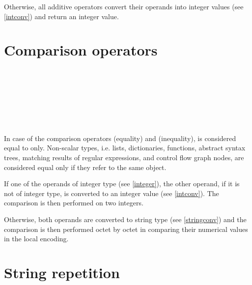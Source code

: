 Otherwise, all additive operators convert their operands into integer
values (see \ref{intconv}) and return an integer value.

\section{Comparison operators}

\begin{grammar}
      \produces {} \\
      \produces {}
         \lextoken{==}  \\
      \produces {}
         \lextoken{!=}  \\
      \produces {}
         \lextoken{<}  \\
      \produces {}
         \lextoken{<=}  \\
      \produces {}
         \lextoken{>=}  \\
      \produces {}
         \lextoken{>} 
\end{grammar}

\noindent
In case of the comparison operators \token{==} (equality)
and \token{!=} (inequality),  is considered equal
to  only. Non-scalar types, i.e. lists, dictionaries,
functions, abstract syntax trees, matching results of regular
expressions, and control flow graph nodes, are considered equal
only if they refer to the same object.

If one of the operands of integer type (see \ref{integer}),
the other operand, if it is not of integer type, is converted to an
integer value (see \ref{intconv}). The comparison is then performed
on two integers.

Otherwise, both operands are converted to string type (see \ref{stringconv})
and the comparison is then performed octet by octet in comparing
their numerical values in the local encoding.

\section{String repetition}

\begin{grammar}
      \produces {} \\
      \produces {}
          
\end{grammar}

